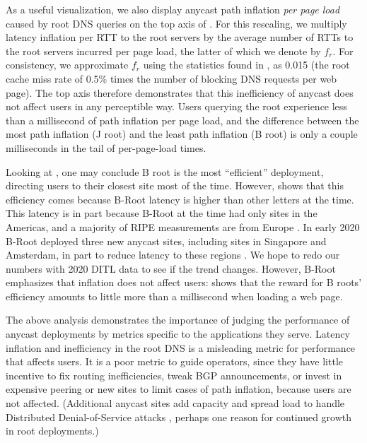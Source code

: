 \documentclass[sigconf,letterpaper,nonacm,10pt,anonymous]{acmart}
\begin{document}
As a useful visualization, we also display anycast path inflation
\emph{per page load} caused by root DNS queries on the top axis of
. For this rescaling, we multiply latency
inflation per RTT to the root servers by the average number of RTTs to
the root servers incurred per page load, the latter of which we denote
by \(f_r\). For consistency, we approximate \(f_r\) using the statistics
found in , as 0.015 (the root cache miss rate
of 0.5\% times the number of blocking DNS requests per web page). The
top axis therefore demonstrates that this inefficiency of anycast does
not affect users in any perceptible way. Users querying the root
experience less than a millisecond of path inflation per page load, and
the difference between the most path inflation (J root) and the least
path inflation (B root) is only a couple milliseconds in the tail of
per-page-load times.

Looking at , one may conclude B root is the
most ``efficient'' deployment, directing users to their closest site
most of the time. However,  shows that
this efficiency comes because B-Root latency is higher than other
letters at the time. This latency is in part because B-Root at the time
had only sites in the Americas, and a majority of RIPE measurements are
from Europe \cite{staff2015ripe}. In early 2020 B-Root deployed three
new anycast sites, including sites in Singapore and Amsterdam, in part
to reduce latency to these regions \cite{BRoot20a}. We hope to redo our
numbers with 2020 DITL data to see if the trend changes. However, B-Root
emphasizes that inflation does not affect users:
 shows that the reward for B roots'
efficiency amounts to little more than a millisecond when loading a web
page.

The above analysis demonstrates the importance of judging the
performance of anycast deployments by metrics specific to the
applications they serve. Latency inflation and inefficiency in the root
DNS is a misleading metric for performance that affects users. It is a
poor metric to guide operators, since they have little incentive to fix
routing inefficiencies, tweak BGP announcements, or invest in expensive
peering or new sites to limit cases of path inflation, because users are
not affected. (Additional anycast sites add capacity and spread load to
handle Distributed Denial-of-Service attacks \cite{moura2016anycast},
perhaps one reason for continued growth in root deployments.)
\end{document}

